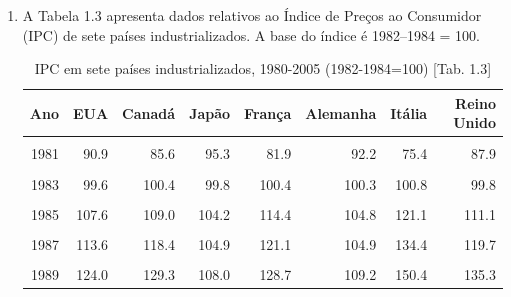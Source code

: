\documentclass[
]{article}
\begin{document}
\begin{enumerate}
\def\labelenumi{\arabic{enumi}.}
\item
  A Tabela 1.3 apresenta dados relativos ao Índice de Preços ao Consumidor (IPC) de sete países
  industrializados. A base do índice é 1982--1984 = 100.

  \begin{table}[H]

   \caption{\label{tab:unnamed-chunk-3}IPC em sete países industrializados, 1980-2005 (1982-1984=100) [Tab. 1.3]}
   \centering
   \begin{tabular}[t]{rrrrrrrr}
   \toprule
   Ano & EUA & Canadá & Japão & França & Alemanha & Itália & Reino Unido\\
   \midrule
   \cellcolor{gray!6}{1980} & \cellcolor{gray!6}{82.4} & \cellcolor{gray!6}{76.1} & \cellcolor{gray!6}{90.9} & \cellcolor{gray!6}{72.3} & \cellcolor{gray!6}{86.7} & \cellcolor{gray!6}{63.2} & \cellcolor{gray!6}{78.5}\\
   1981 & 90.9 & 85.6 & 95.3 & 81.9 & 92.2 & 75.4 & 87.9\\
   \cellcolor{gray!6}{1982} & \cellcolor{gray!6}{96.5} & \cellcolor{gray!6}{94.9} & \cellcolor{gray!6}{98.1} & \cellcolor{gray!6}{91.7} & \cellcolor{gray!6}{97.1} & \cellcolor{gray!6}{87.7} & \cellcolor{gray!6}{95.4}\\
   1983 & 99.6 & 100.4 & 99.8 & 100.4 & 100.3 & 100.8 & 99.8\\
   \cellcolor{gray!6}{1984} & \cellcolor{gray!6}{103.9} & \cellcolor{gray!6}{104.7} & \cellcolor{gray!6}{102.1} & \cellcolor{gray!6}{108.1} & \cellcolor{gray!6}{102.7} & \cellcolor{gray!6}{111.5} & \cellcolor{gray!6}{104.8}\\
   1985 & 107.6 & 109.0 & 104.2 & 114.4 & 104.8 & 121.1 & 111.1\\
   \cellcolor{gray!6}{1986} & \cellcolor{gray!6}{109.6} & \cellcolor{gray!6}{113.5} & \cellcolor{gray!6}{104.9} & \cellcolor{gray!6}{117.3} & \cellcolor{gray!6}{104.7} & \cellcolor{gray!6}{128.5} & \cellcolor{gray!6}{114.9}\\
   1987 & 113.6 & 118.4 & 104.9 & 121.1 & 104.9 & 134.4 & 119.7\\
   \cellcolor{gray!6}{1988} & \cellcolor{gray!6}{118.3} & \cellcolor{gray!6}{123.2} & \cellcolor{gray!6}{105.6} & \cellcolor{gray!6}{124.4} & \cellcolor{gray!6}{106.3} & \cellcolor{gray!6}{141.1} & \cellcolor{gray!6}{125.6}\\
   1989 & 124.0 & 129.3 & 108.0 & 128.7 & 109.2 & 150.4 & 135.3\\

\end{tabular}
\end{table}
\end{enumerate}
\end{document}
